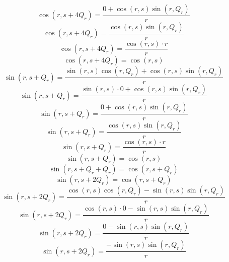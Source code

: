 \documentclass[a4paper,12pt]{report}
\begin{document}
\begin{equation}
\cos(r,s + 4Q_r) = \frac{0 + \cos(r,s) \sin(r,Q_r)}{r}
\end{equation}
\begin{equation}
\cos(r,s + 4Q_r) = \frac{\cos(r,s) \sin(r,Q_r)}{r}
\end{equation}
\begin{equation}
\cos(r,s + 4Q_r) = \frac{\cos(r,s) \cdot r}{r}
\end{equation}
\begin{equation}
\cos(r,s + 4Q_r) = \cos(r,s)
\end{equation}
\begin{equation}
\sin(r,s + Q_r) = \frac{\sin(r,s) \cos(r,Q_r) + \cos(r,s) \sin(r,Q_r)}{r}
\end{equation}
\begin{equation}
\sin(r,s + Q_r) = \frac{\sin(r,s) \cdot 0 + \cos(r,s) \sin(r,Q_r)}{r}
\end{equation}
\begin{equation}
\sin(r,s + Q_r) = \frac{0 + \cos(r,s) \sin(r,Q_r)}{r}
\end{equation}
\begin{equation}
\sin(r,s + Q_r) = \frac{\cos(r,s) \sin(r,Q_r)}{r}
\end{equation}
\begin{equation}
\sin(r,s + Q_r) = \frac{\cos(r,s) \cdot r}{r}
\end{equation}
\begin{equation}
\sin(r,s + Q_r) = \cos(r,s)
\end{equation}
\begin{equation}
\sin(r,s + Q_r + Q_r) = \cos(r,s + Q_r)
\end{equation}
\begin{equation}
\sin(r,s + 2Q_r) = \cos(r,s + Q_r)
\end{equation}
\begin{equation}
\sin(r,s + 2Q_r) = \frac{\cos(r,s) \cos(r,Q_r) - \sin(r,s) \sin(r,Q_r)}{r}
\end{equation}
\begin{equation}
\sin(r,s + 2Q_r) = \frac{\cos(r,s) \cdot 0 - \sin(r,s) \sin(r,Q_r)}{r}
\end{equation}
\begin{equation}
\sin(r,s + 2Q_r) = \frac{0 - \sin(r,s) \sin(r,Q_r)}{r}
\end{equation}
\begin{equation}
\sin(r,s + 2Q_r) = \frac{-\sin(r,s) \sin(r,Q_r)}{r}
\end{equation}
\end{document}
